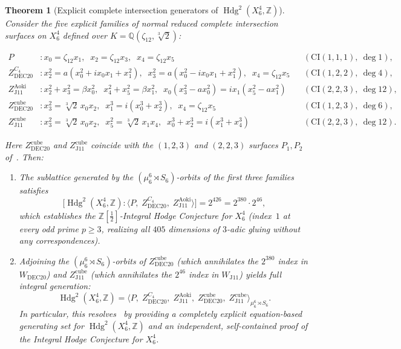 \documentclass[11pt,a4paper]{amsart}
\newtheorem{theorem}{Theorem}[section]
\theoremstyle{definition}
\newcommand{\ZZ}{\mathbb{Z}}
\newcommand{\QQ}{\mathbb{Q}}
\newcommand{\Hdg}{\operatorname{Hdg}}
\newcommand{\CI}{\mathrm{CI}}
\begin{document}
\begin{theorem}[Explicit complete intersection generators of $\Hdg^2(X_6^4, \ZZ)$]\label{thm:C}
Consider the five explicit families of normal reduced complete intersection surfaces on $X_6^4$ defined over $K = \QQ(\zeta_{12}, \sqrt[3]{2})$:
\begin{small}
\begin{align*}
  P &: x_0 = \zeta_{12} x_1,\;\; x_2 = \zeta_{12} x_3,\;\; x_4 = \zeta_{12} x_5 && (\CI(1,1,1),\ \deg 1), \\
  Z_{\mathrm{DEC20}}^{C_4} &: x_2^2 = a(x_0^2 + i x_0 x_1 + x_1^2),\;\; x_3^2 = a(x_0^2 - i x_0 x_1 + x_1^2),\;\; x_4 = \zeta_{12} x_5 && (\CI(1,2,2),\ \deg 4), \\
  Z_{\mathrm{J11}}^{\mathrm{Aoki}} &: x_2^2 + x_3^2 = \beta x_0^2,\;\; x_4^2 + x_5^2 = \beta x_1^2,\;\; x_0(x_3^2 - a x_0^2) = i x_1(x_5^2 - a x_1^2) && (\CI(2,2,3),\ \deg 12), \\
  Z_{\mathrm{DEC20}}^{\mathrm{cube}} &: x_3^2 = \sqrt[3]{2}\, x_0 x_2,\;\; x_1^3 = i(x_0^3 + x_2^3),\;\; x_4 = \zeta_{12} x_5 && (\CI(1,2,3),\ \deg 6), \\
  Z_{\mathrm{J11}}^{\mathrm{cube}} &: x_3^2 = \sqrt[3]{2}\, x_0 x_2,\;\; x_5^2 = \sqrt[3]{2}\, x_1 x_4,\;\; x_0^3 + x_2^3 = i(x_1^3 + x_4^3) && (\CI(2,2,3),\ \deg 12).
\end{align*}
\end{small}
Here $Z_{\mathrm{DEC20}}^{\mathrm{cube}}$ and $Z_{\mathrm{J11}}^{\mathrm{cube}}$ coincide with the $(1,2,3)$ and $(2,2,3)$ surfaces $P_1, P_2$ of~\cite{BFLGVL24,SdJ26}. Then:
\begin{enumerate}
  \item The sublattice generated by the $(\mu_6^6 \rtimes S_6)$-orbits of the first three families satisfies
  \[
    \bigl[\Hdg^2(X_6^4, \ZZ) : \langle P,\; Z_{\mathrm{DEC20}}^{C_4},\; Z_{\mathrm{J11}}^{\mathrm{Aoki}} \rangle\bigr] = 2^{426} = 2^{380} \cdot 2^{46},
  \]
  which establishes the $\ZZ[\tfrac{1}{2}]$-Integral Hodge Conjecture for $X_6^4$ (index~$1$ at every odd prime $p \ge 3$, realizing all $405$ dimensions of $3$-adic gluing without any correspondences).
  \item Adjoining the $(\mu_6^6 \rtimes S_6)$-orbits of $Z_{\mathrm{DEC20}}^{\mathrm{cube}}$ (which annihilates the $2^{380}$ index in $W_{\mathrm{DEC20}}$) and $Z_{\mathrm{J11}}^{\mathrm{cube}}$ (which annihilates the $2^{46}$ index in $W_{\mathrm{J11}}$) yields full integral generation:
  \[
    \Hdg^2(X_6^4, \ZZ) = \langle P,\; Z_{\mathrm{DEC20}}^{C_4},\; Z_{\mathrm{J11}}^{\mathrm{Aoki}},\; Z_{\mathrm{DEC20}}^{\mathrm{cube}},\; Z_{\mathrm{J11}}^{\mathrm{cube}} \rangle_{\mu_6^6 \rtimes S_6}.
  \]
  In particular, this resolves~\cite[Remark~8(1)]{SdJ26} by providing a completely explicit equation-based generating set for $\Hdg^2(X_6^4, \ZZ)$ and an independent, self-contained proof of the Integral Hodge Conjecture for $X_6^4$.
\end{enumerate}
\end{theorem}
\end{document}
